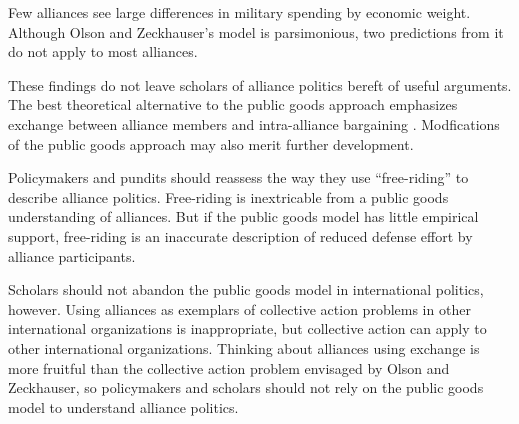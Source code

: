 \documentclass[12pt]{article}
\begin{document}
Few alliances see large differences in military spending by economic weight. 
Although Olson and Zeckhauser's model is parsimonious, two predictions from it do not apply to most alliances. 


These findings do not leave scholars of alliance politics bereft of useful arguments. 
The best theoretical alternative to the public goods approach emphasizes exchange between alliance members and intra-alliance bargaining \citep{Morrow1991, Norrlof2010, Brooksetal2013, Johnson2015, Kim2016}. 
Modfications of the public goods approach \citep{SandlerHartley2001} may also merit further development. 


Policymakers and pundits should reassess the way they use ``free-riding'' to describe alliance politics. 
Free-riding is inextricable from a public goods understanding of alliances.
But if the public goods model has little empirical support, free-riding is an inaccurate description of reduced defense effort by alliance participants.  


Scholars should not abandon the public goods model in international politics, however.   
Using alliances as exemplars of collective action problems in other international organizations is inappropriate, but collective action can apply to other international organizations. 
Thinking about alliances using exchange is more fruitful than the collective action problem envisaged by Olson and Zeckhauser, so policymakers and scholars should not rely on the public goods model to understand alliance politics.  



\singlespace


 
\end{document}
